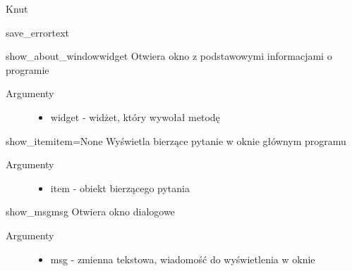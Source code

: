 \documentclass[letterpaper,10pt,polish]{manual}
\begin{document}
\begin{classdesc}{Knut}{}
\begin{methoddesc}{save\_error}{text}
\begin{description}
\begin{itemize}
\end{itemize}

\end{description}
\end{methoddesc}

\hypertarget{Knut.Knut.show\_about\_window}{}\begin{methoddesc}{show\_about\_window}{widget}
Otwiera okno z podstawowymi informacjami o programie
\begin{description}
\item[Argumenty] \leavevmode\begin{itemize}
\item {} 
widget - widżet, który wywołał metodę

\end{itemize}

\end{description}
\end{methoddesc}

\hypertarget{Knut.Knut.show\_item}{}\begin{methoddesc}{show\_item}{item=None}
Wyświetla bierzące pytanie w oknie głównym programu
\begin{description}
\item[Argumenty] \leavevmode\begin{itemize}
\item {} 
item - obiekt bierzącego pytania

\end{itemize}

\end{description}
\end{methoddesc}

\hypertarget{Knut.Knut.show\_msg}{}\begin{methoddesc}{show\_msg}{msg}
Otwiera okno dialogowe
\begin{description}
\item[Argumenty] \leavevmode\begin{itemize}
\item {} 
msg - zmienna tekstowa, wiadomość do wyświetlenia w oknie

\end{itemize}

\end{description}
\end{methoddesc}


\end{classdesc}
\end{document}
